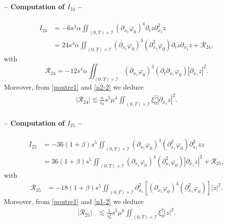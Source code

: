 \documentclass[a4paper, 12pt]{article}
\theoremstyle{plain}
\theoremstyle{definition}
\numberwithin{theorem}{section}
\numberwithin{equation}{section}
\begin{document}
{\paragraph{-- Computation of $I_{24}$ --}
\begin{align*}
I_{24}&=-6s^4\alpha\iint_{(0,T)\times\mathcal{I}}(\partial_{x_1}\varphi_0)^4\partial_tz\partial^2_{x_1}z\\
&=24s^4\alpha\iint_{(0,T)\times\mathcal{I}}(\partial_{x_1}\varphi_0)^3(\partial^2_{x_1}\varphi_0)\partial_tz\partial_{x_1}z+\mathcal{R}_{24},
\end{align*}
with $$\mathcal{R}_{24}=-12s^4\alpha\iint_{(0,T)\times\mathcal{I}}(\partial_{x_1}\varphi_0)^3(\partial_t\partial_{x_1}\varphi_0)|\partial_{x_1}z|^2.$$
Moreover, from \eqref{poutre1} and \eqref{n2-2} we deduce
\begin{align}
|\mathcal{R}_{24}|\lesssim \frac{\alpha}{s_0}s^5\mu^4\iint_{(0,T)\times\mathcal{I}} \xi_0^5|\partial_{x_1}z|^2.\label{EstR24}
\end{align}
\paragraph{-- Computation of $I_{25}$ --}
\begin{align*}
I_{25}&=-36(1+\beta)s^5\iint_{(0,T)\times\mathcal{I}}(\partial_{x_1}\varphi_0)^4(\partial^2_{x_1}\varphi_0)\partial^2_{x_1}zz\\
&=36(1+\beta)s^5\iint_{(0,T)\times\mathcal{I}}(\partial_{x_1}\varphi_0)^4(\partial^2_{x_1}\varphi_0)|\partial_{x_1}z|^2+\mathcal{R}_{25},
\end{align*}
with
\begin{align*}
\mathcal{R}_{25}&=-18(1+\beta) s^5\iint_{(0,T)\times\mathcal{I}}\partial_{x_1}^2[(\partial_{x_1}\varphi_0)^4(\partial^2_{x_1}\varphi_0)]|z|^2.
\end{align*}
Moreover, from \eqref{poutre1} and \eqref{n1-2} we deduce
\begin{align}\label{EstR25}
|\mathcal{R}_{25}|&\lesssim \frac{1}{s_0^2}s^5\mu^8\iint_{(0,T)\times\mathcal{I}}\xi_0^7 |z|^2.
\end{align}
}
\end{document}
